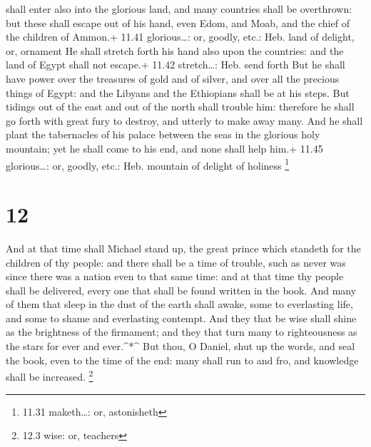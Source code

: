 shall enter also into the glorious land, and many countries shall be
overthrown: but these shall escape out of his hand, even Edom, and Moab,
and the chief of the children of Ammon.+ 11.41 glorious\ldots: or,
goodly, etc.: Heb. land of delight, or, ornament  He shall
stretch forth his hand also upon the countries: and the land of Egypt
shall not escape.+ 11.42 stretch\ldots: Heb. send forth 
But he shall have power over the treasures of gold and of silver, and
over all the precious things of Egypt: and the Libyans and the
Ethiopians shall be at his steps.  But tidings out of the
east and out of the north shall trouble him: therefore he shall go forth
with great fury to destroy, and utterly to make away many. 
And he shall plant the tabernacles of his palace between the seas in the
glorious holy mountain; yet he shall come to his end, and none shall
help him.+ 11.45 glorious\ldots: or, goodly, etc.: Heb. mountain of
delight of holiness \footnote{11.31 maketh\ldots: or, astonisheth}

\hypertarget{section-11}{%
\section{12}\label{section-11}}

 And at that time shall Michael stand up, the great prince
which standeth for the children of thy people: and there shall be a time
of trouble, such as never was since there was a nation even to that same
time: and at that time thy people shall be delivered, every one that
shall be found written in the book.  And many of them that
sleep in the dust of the earth shall awake, some to everlasting life,
and some to shame and everlasting contempt.  And they that
be wise shall shine as the brightness of the firmament; and they that
turn many to righteousness as the stars for ever and ever.\^{}*\^{}
 But thou, O Daniel, shut up the words, and seal the book,
even to the time of the end: many shall run to and fro, and knowledge
shall be increased. \footnote{12.3 wise: or, teachers}


